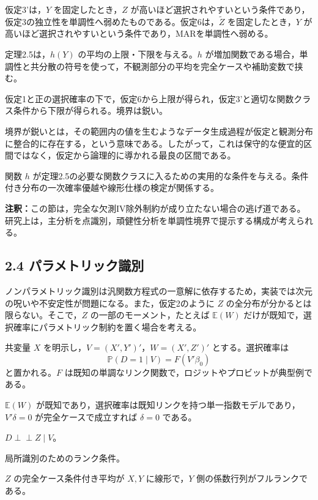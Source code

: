 \documentclass[10pt,a4paper]{article}
\newcommand{\indep}{\mathrel{\perp\!\!\!\perp}}
\newcommand{\E}{\mathbb{E}}
\newcommand{\Prb}{\mathbb{P}}
\newcommand{\note}[1]{\par\smallskip\noindent\textbf{注釈：}#1\par\smallskip}
\begin{document}
仮定3'は，$Y$ を固定したとき，$Z$ が高いほど選択されやすいという条件であり，仮定3の独立性を単調性へ弱めたものである。仮定6は，$\widetilde Z$ を固定したとき，$Y$ が高いほど選択されやすいという条件であり，MARを単調性へ弱める。

定理2.5は，$h(Y)$ の平均の上限・下限を与える。$h$ が増加関数である場合，単調性と共分散の符号を使って，不観測部分の平均を完全ケースや補助変数で挟む。

\begin{description}[leftmargin=3.2em]
\item[定理2.5] 仮定1と正の選択確率の下で，仮定6から上限が得られ，仮定3'と適切な関数クラス条件から下限が得られる。境界は鋭い。
\end{description}

境界が鋭いとは，その範囲内の値を生むようなデータ生成過程が仮定と観測分布に整合的に存在する，という意味である。したがって，これは保守的な便宜的区間ではなく，仮定から論理的に導かれる最良の区間である。

\begin{description}[leftmargin=3.2em]
\item[命題2.6] 関数 $h$ が定理2.5の必要な関数クラスに入るための実用的な条件を与える。条件付き分布の一次確率優越や線形仕様の検定が関係する。
\end{description}

\note{この節は，完全な欠測IV除外制約が成り立たない場合の逃げ道である。研究上は，主分析を点識別，頑健性分析を単調性境界で提示する構成が考えられる。}

\subsection{2.4 パラメトリック識別}

ノンパラメトリック識別は汎関数方程式の一意解に依存するため，実装では次元の呪いや不安定性が問題になる。また，仮定2のように $Z$ の全分布が分かるとは限らない。そこで，$Z$ の一部のモーメント，たとえば $\E(W)$ だけが既知で，選択確率にパラメトリック制約を置く場合を考える。

共変量 $X$ を明示し，$V=(X',Y')'$，$W=(X',Z')'$ とする。選択確率は
\[
\Prb(D=1\mid V)=F(V'\beta_0)
\]
と置かれる。$F$ は既知の単調なリンク関数で，ロジットやプロビットが典型例である。

\begin{description}[leftmargin=3.2em]
\item[仮定2'] $\E(W)$ が既知であり，選択確率は既知リンクを持つ単一指数モデルであり，$V'\delta=0$ が完全ケースで成立すれば $\delta=0$ である。
\item[仮定3'] $D\indep Z\mid V$。
\item[仮定4'] 局所識別のためのランク条件。
\item[仮定4''] $Z$ の完全ケース条件付き平均が $X,Y$ に線形で，$Y$ 側の係数行列がフルランクである。
\end{description}
\end{document}
